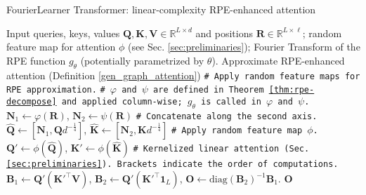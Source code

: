 \begin{algorithm*}
\caption{FourierLearner Transformer: linear-complexity RPE-enhanced attention}
\label{alg:flt}
\begin{algorithmic}[1] %
\REQUIRE Input queries, keys, values $\mathbf{Q}, \mathbf{K}, \mathbf{V} \in \mathbb{R}^{L \times d}$ and positions $\mathbf{R}\in\mathbb{R}^{L\times \ell}$; random feature map for attention $\phi$ (see Sec. \ref{sec:preliminaries}); Fourier Transform of the RPE function $g_{\theta}$ (potentially parametrized by $\theta$).
\ENSURE Approximate RPE-enhanced attention (Definition \ref{gen_graph_attention})
\STATE \texttt{\# Apply random feature maps for RPE approximation.}
\STATE \texttt{\# $\varphi$ and $\psi$ are defined in Theorem \ref{thm:rpe-decompose} and applied column-wise; $g_{\theta}$ is called in $ \varphi$ and $\psi$.}
\STATE $\mathbf{N}_{1}\leftarrow \varphi(\mathbf{R})$, $\mathbf{N}_{2}\leftarrow \psi(\mathbf{R})$ 
\STATE \texttt{\# Concatenate along the second axis.}
\STATE $\widehat{\mathbf{Q}} \leftarrow [\mathbf{N}_{1},\mathbf{Q}d^{-\frac{1}{4}}] $,
$\widehat{\mathbf{K}} \leftarrow [\mathbf{N}_{2},\mathbf{K}d^{-\frac{1}{4}}]$ 
\STATE \texttt{\# Apply random feature map $\phi$.}
\STATE $\mathbf{Q}' \leftarrow \phi(\widehat{\mathbf{Q}})$, $\mathbf{K}' \leftarrow \phi(\widehat{\mathbf{K}})$
\STATE \texttt{\# Kernelized linear attention (Sec. \ref{sec:preliminaries}). Brackets indicate the order of computations.}
\STATE $\mathbf{B}_1\leftarrow \mathbf{Q}'(\mathbf{K}'^{\top} \mathbf{V})$, $\mathbf{B}_2\leftarrow \mathbf{Q}'(\mathbf{K}'^{\top} \mathbf{1}_L)$, $\mathbf{O}\leftarrow\mathrm{diag}(\mathbf{B}_2)^{-1}\mathbf{B}_1$.
\RETURN $\mathbf{O}$
\end{algorithmic}
\end{algorithm*}

